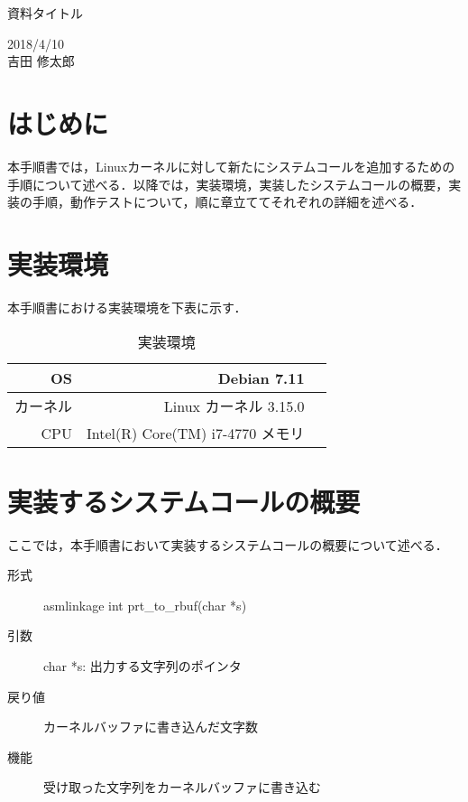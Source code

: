 \documentclass[12pt]{jsarticle}
\begin{document}
\begin{center}
{\LARGE 資料タイトル}
\end{center}

\begin{flushright}
  2018/4/10\\
  吉田 修太郎
\end{flushright}
\section{はじめに}
本手順書では，Linuxカーネルに対して新たにシステムコールを追加するための手順について述べる．以降では，実装環境，実装したシステムコールの概要，実装の手順，動作テストについて，順に章立ててそれぞれの詳細を述べる．

\section{実装環境}
本手順書における実装環境を下表に示す．
\begin{table}[tb]
  \begin{center}
    \caption{実装環境}%
    \begin{tabular}{r|r}
      \hline\hline
      OS & Debian 7.11 \\
      \hline
      カーネル & Linux カーネル 3.15.0\\
      \hline
      CPU & Intel(R) Core(TM) i7-4770
      \hline
      メモリ & 
      \hline
    \end{tabular}
  \end{center}
\end{table}

\section{実装するシステムコールの概要}
ここでは，本手順書において実装するシステムコールの概要について述べる．
\begin{description}
\item[形式] asmlinkage int prt\_to\_rbuf(char *s)
\item[引数] char *s: 出力する文字列のポインタ
\item[戻り値] カーネルバッファに書き込んだ文字数
\item[機能] 受け取った文字列をカーネルバッファに書き込む
  
\end{description}
\end{document}
